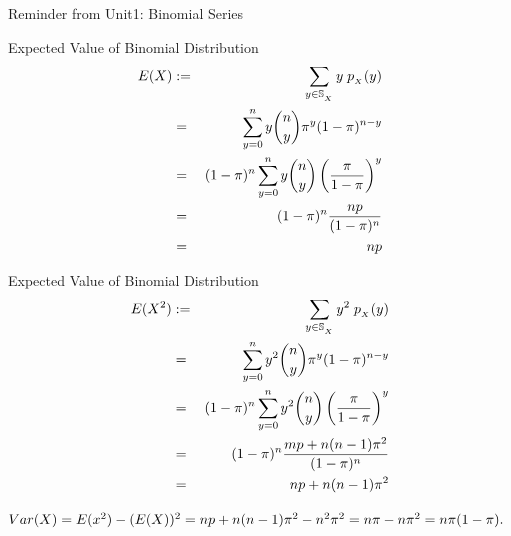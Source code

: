 \documentclass[compress]{beamer}
\begin{document}
{


\begin{frame}{Reminder from Unit1: Binomial Series }
\vspace{.1in}
{}
\end{frame}
}

\begin{frame}{Expected Value of Binomial Distribution}
\begin{eqnarray}
E(X)& := &  \sum_{y\in \support[X]} y\; \pmf_{_X}(y) \nonumber\\
& = &  \sum_{y=0}^{n} y {n\choose y}\binP^y(1-\binP)^{n-y}  \nonumber\\
& =& (1-\binP)^{n}  \sum_{y=0}^{n}  y {n\choose y}\left( \frac{\binP}{1-\binP}\right)^y   \nonumber\\
& =& (1-\binP)^{n}  \frac{np}{(1-\binP)^n} \nonumber\\
& =& np
\end{eqnarray}

\end{frame}


\begin{frame}{Expected Value of Binomial Distribution}
\begin{eqnarray}
E(X^2)& := &  \sum_{y\in \support[X]} y^2\; \pmf_{_X}(y) \nonumber\\
& = &  \sum_{y=0}^{n} y^2 {n\choose y}\binP^y(1-\binP)^{n-y}  \nonumber\\
& =& (1-\binP)^{n}  \sum_{y=0}^{n}  y^2 {n\choose y}\left( \frac{\binP}{1-\binP}\right)^y   \nonumber\\
& =& (1-\binP)^{n}  \frac{mp+ n(n-1)\binP^2}{(1-\binP)^n} \nonumber\\
& =& np+ n(n-1)\binP^2
\end{eqnarray}

$Var(X)= E(x^2)- (E(X))^2= np+n(n-1)\pi^2- n^2 \pi^2= n\pi-n \pi^2= n\pi (1-\pi). $

\end{frame}
\end{document}

